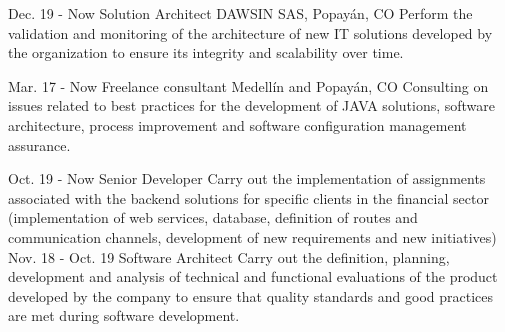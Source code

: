 \documentclass[american]{cv-class}
\begin{document}
\begin{entrylist}
	\entry
	{Dec. 19 - Now}
	{Solution Architect}
	{DAWSIN SAS, Popayán, CO}
	{Perform the validation and monitoring of the architecture
	of new IT solutions developed by the organization to ensure its integrity and scalability over time.}
	
	\entry
	{Mar. 17 - Now}
	{Freelance consultant}
	{Medellín and Popayán, CO}
	{Consulting on issues related to best practices for the development of JAVA solutions, software architecture, process improvement and software configuration management assurance.}
	  
	\entry
	{Oct. 19 - Now}
	{Senior Developer}
	{ }
	{Carry out the implementation of assignments associated with the backend solutions for specific clients in the financial sector (implementation of web services, database, definition of routes and communication channels, development of new requirements and new initiatives)}
	\entry
	{Nov. 18 - Oct. 19}
	{Software Architect}
	{ }
	{Carry out the definition, planning, development and analysis of technical and functional evaluations of the product developed by the company to ensure that quality standards and good practices are met during software development.}
	    

\end{entrylist}
\end{document}
